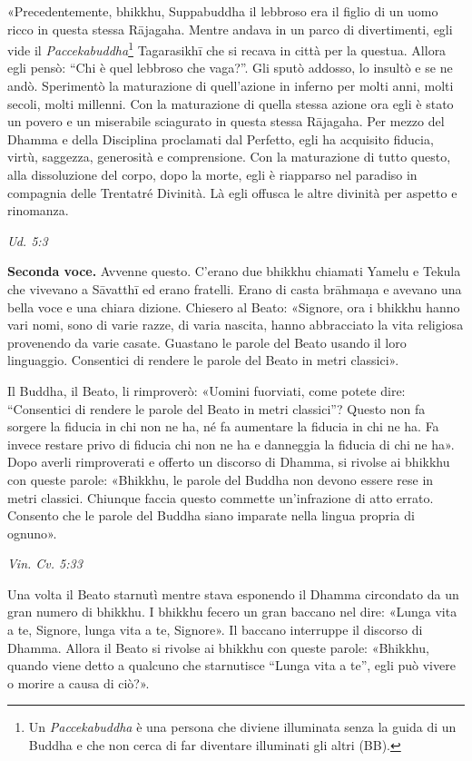 «Precedentemente, bhikkhu, Suppabuddha il lebbroso era il figlio di un
uomo ricco in questa stessa Rājagaha. Mentre andava in un parco di
divertimenti, egli vide il
\emph{Paccekabuddha}\footnote{Un \emph{Paccekabuddha} è una persona che diviene illuminata senza la guida di un Buddha e che non cerca di far diventare illuminati gli altri (BB).} Tagarasikhī che si recava in città
per la questua. Allora egli pensò: “Chi è quel lebbroso che vaga?”. Gli
sputò addosso, lo insultò e se ne andò. Sperimentò la maturazione di
quell’azione in inferno per molti anni, molti secoli, molti millenni.
Con la maturazione di quella stessa azione ora egli è stato un povero e
un miserabile sciagurato in questa stessa Rājagaha. Per mezzo del Dhamma
e della Disciplina proclamati dal Perfetto, egli ha acquisito fiducia,
virtù, saggezza, generosità e comprensione. Con la maturazione di tutto
questo, alla dissoluzione del corpo, dopo la morte, egli è riapparso nel
paradiso in compagnia delle Trentatré Divinità. Là egli offusca le altre
divinità per aspetto e rinomanza.


\emph{Ud. 5:3}


\textbf{Seconda voce.} Avvenne questo. C’erano due bhikkhu chiamati Yamelu e
Tekula che vivevano a Sāvatthī ed erano fratelli. Erano di casta
brāhmaṇa e avevano una bella voce e una chiara dizione. Chiesero al
Beato: «Signore, ora i bhikkhu hanno vari nomi, sono di varie razze, di
varia nascita, hanno abbracciato la vita religiosa provenendo da varie
casate. Guastano le parole del Beato usando il loro linguaggio.
Consentici di rendere le parole del Beato in metri classici».


Il Buddha, il Beato, li rimproverò: «Uomini fuorviati, come potete dire:
“Consentici di rendere le parole del Beato in metri classici”? Questo
non fa sorgere la fiducia in chi non ne ha, né fa aumentare la fiducia
in chi ne ha. Fa invece restare privo di fiducia chi non ne ha e
danneggia la fiducia di chi ne ha». Dopo averli rimproverati e offerto
un discorso di Dhamma, si rivolse ai bhikkhu con queste parole:
«Bhikkhu, le parole del Buddha non devono essere rese in metri classici.
Chiunque faccia questo commette un’infrazione di atto errato. Consento
che le parole del Buddha siano imparate nella lingua propria di ognuno».


\emph{Vin. Cv. 5:33}


Una volta il Beato starnutì mentre stava esponendo il Dhamma circondato
da un gran numero di bhikkhu. I bhikkhu fecero un gran baccano nel dire:
«Lunga vita a te, Signore, lunga vita a te, Signore». Il baccano
interruppe il discorso di Dhamma. Allora il Beato si rivolse ai bhikkhu
con queste parole: «Bhikkhu, quando viene detto a qualcuno che
starnutisce “Lunga vita a te”, egli può vivere o morire a causa di
ciò?».


